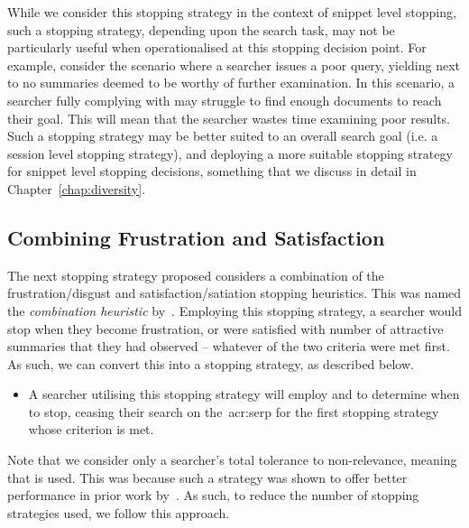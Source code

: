 While we consider this stopping strategy in the context of snippet level stopping, such a stopping strategy, depending upon the search task, may not be particularly useful when operationalised at this stopping decision point. For example, consider the scenario where a searcher issues a poor query, yielding next to no summaries deemed to be worthy of further examination. In this scenario, a searcher fully complying with  may struggle to find enough documents to reach their goal. This will mean that the searcher wastes time examining poor results. Such a stopping strategy may be better suited to an overall search goal (i.e. a session level stopping strategy), and deploying a more suitable stopping strategy for snippet level stopping decisions, something that we discuss in detail in Chapter~\ref{chap:diversity}.

\subsection{Combining Frustration and Satisfaction}
The next stopping strategy proposed considers a combination of the frustration/disgust and satisfaction/satiation stopping heuristics. This was named the \emph{combination heuristic} by~\cite{kraft1979stopping_rules}. Employing this stopping strategy, a searcher would stop when they become frustration, or were satisfied with number of attractive summaries that they had observed -- whatever of the two criteria were met first. As such, we can convert this into a stopping strategy, as described below.

\begin{itemize}
    \item{ A searcher utilising this stopping strategy will employ  and  to determine when to stop, ceasing their search on the~\gls{acr:serp} for the first stopping strategy whose criterion is met.}
\end{itemize}

Note that we consider only a searcher's total tolerance to non-relevance, meaning that  is used. This was because such a strategy was shown to offer better performance in prior work by~\cite{maxwell2015stopping_strategies}. As such, to reduce the number of stopping strategies used, we follow this approach.


